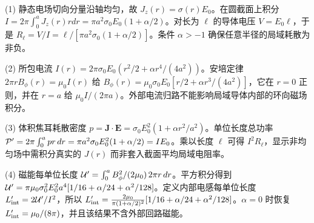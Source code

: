 (1) 静态电场切向分量沿轴均匀，故 \(J_z(r)=\sigma(r)E_0\)。在圆截面上积分 \(I=2\pi\int_0^a J_z(r)rdr=\pi a^2\sigma_0E_0(1+\alpha/2)\)。对长为 \(\ell\) 的导体电压 \(V=E_0\ell\)，于是 \(R_\ell=V/I=\ell/[\pi a^2\sigma_0(1+\alpha/2)]\)。条件 \(\alpha>-1\) 确保任意半径的局域耗散为非负。

(2) 所包电流 \(I(r)=2\pi\sigma_0E_0(r^2/2+\alpha r^4/(4a^2))\)。安培定律 \(2\pi r B_\phi(r)=\mu_0I(r)\) 给 \(B_\phi(r)=\mu_0\sigma_0E_0[r/2+\alpha r^3/(4a^2)]\)，它在 \(r=0\) 正则，并在 \(r=a\) 给 \(\mu_0I/(2\pi a)\)。外部电流归路不能影响局域导体内部的环向磁场积分。

(3) 体积焦耳耗散密度 \(p=\boldsymbol J\cdot\boldsymbol E=\sigma_0E_0^2(1+\alpha r^2/a^2)\)。单位长度总功率 \({\cal P}'=2\pi\int_0^a pr\,dr=\pi a^2\sigma_0E_0^2(1+\alpha/2)=I E_0\)。乘以长度 \(\ell\) 可得 \(I^2 R_\ell\)，显示非均匀场中需积分真实的 \(J(r)\) 而非套入截面平均局域电阻率。

(4) 磁能每单位长度 \({\cal U}'=\int_0^a B_\phi^2/(2\mu_0)\,2\pi r\,dr\)。平方积分得到 \({\cal U}'=\pi\mu_0\sigma_0^2E_0^2a^4[1/16+\alpha/24+\alpha^2/128]\)。定义内部电感每单位长度 \(L'_{\rm int}=2{\cal U}'/I^2\)，所以 \(L'_{\rm int}={2\mu_0\over\pi(1+\alpha/2)^2}[1/16+\alpha/24+\alpha^2/128]\)。\(\alpha=0\) 时恢复 \(L'_{\rm int}=\mu_0/(8\pi)\)，并且该结果不含外部回路磁能。
